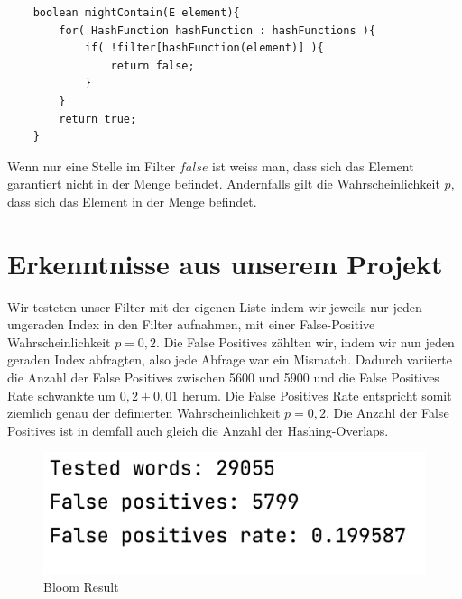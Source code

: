 \documentclass{article}
\begin{document}
\begin{lstlisting}
    boolean mightContain(E element){
        for( HashFunction hashFunction : hashFunctions ){
            if( !filter[hashFunction(element)] ){
                return false;
            }
        }
        return true;
    }
\end{lstlisting}
Wenn nur eine Stelle im Filter $false$ ist weiss man, dass sich das Element garantiert nicht in der Menge befindet. Andernfalls gilt die Wahrscheinlichkeit $p$, dass sich das Element in der Menge befindet.

\clearpage

\section{Erkenntnisse aus unserem Projekt}
Wir testeten unser Filter mit der eigenen Liste indem wir jeweils nur jeden ungeraden Index in den Filter aufnahmen, mit einer False-Positive Wahrscheinlichkeit $p = 0,2$. Die False Positives zählten wir, indem wir nun jeden geraden Index abfragten, also jede Abfrage war ein Mismatch. Dadurch variierte die Anzahl der False Positives zwischen 5600 und 5900 und die False Positives Rate schwankte um $0,2 \pm 0,01$ herum. Die False Positives Rate entspricht somit ziemlich genau der definierten Wahrscheinlichkeit $p = 0,2$. Die Anzahl der False Positives ist in demfall auch gleich die Anzahl der Hashing-Overlaps.
\begin{figure}[h!]
    \centering
    \includegraphics{./lib/dist_bloomResult.png}
    \caption{Bloom Result}
    \label{fig:Bloom Result}
\end{figure}
\end{document}
